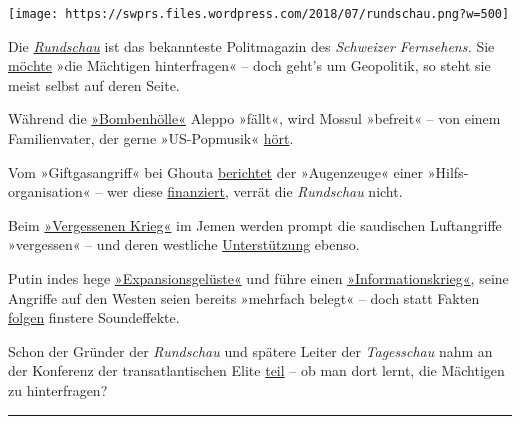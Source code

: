 \texttt{[image: https://swprs.files.wordpress.com/2018/07/rundschau.png?w=500]}

Die
\emph{\href{https://de.wikipedia.org/wiki/Rundschau_(SRF)}{Rundschau}}
ist das bekannteste Polit­ma­ga­zin des \emph{Schweizer Fernsehens.} Sie
\href{https://www.srf.ch/sendungen/rundschau/50-jahre-rundschau-die-jubilaeumssendung}{möchte}
»die Mächtigen hinterfragen« -- doch geht's um Geo­po­litik, so steht
sie meist selbst auf deren Seite.

Während die
\href{https://www.srf.ch/sendungen/rundschau/subventionierte-piloten-vaeter-am-limit-bombenhoelle-aleppo}{»Bombenhölle«}
Aleppo »fällt«, wird Mossul »befreit« -- von einem Familien­vater, der
gerne »US-Popmusik«
\href{https://www.srf.ch/sendungen/rundschau/buben-beschneidung-michel-bollag-pkb-west-mossul}{hört}.

Vom »Giftgasangriff« bei Ghouta
\href{https://www.srf.ch/sendungen/rundschau/kriminaltouristen-verhuetungsmittel-j-bitzer-giftgaseinsatz}{berichtet}
der »Augen­zeuge« einer »Hilfs­organisation« -- wer diese
\href{http://www.uossm.org/who_we_are}{finanziert}, verrät die
\emph{Rundschau} nicht.

Beim
\href{https://www.srf.ch/sendungen/rundschau/gehorsam-und-ehelos-klamauk-statt-kompromiss-vergessener-krieg}{»Vergessenen
Krieg«} im Jemen werden prompt die saudischen Luftangriffe »vergessen«
-- und deren westliche
\href{https://www.strategic-culture.org/news/2018/06/18/western-media-whitewash-yemen-genocide.html}{Unterstützung}
ebenso.

Putin indes hege
\href{https://www.srf.ch/sendungen/rundschau/gianni-infantino-fatma-samoura-iv-kosovaren-zittern-vor-russen}{»Expansionsgelüste«}
und füh­re einen
\href{https://www.srf.ch/sendungen/rundschau/putins-informationskrieg-milliarden-jongleur-bastos-camorra}{»Informationskrieg«},
seine Angriffe auf den Westen seien bereits »mehrfach be­legt« -- doch
statt Fakten
\href{https://www.srf.ch/sendungen/rundschau/putins-informationskrieg-milliarden-jongleur-bastos-camorra}{folgen}
finstere Sound­effekte.

Schon der Gründer der \emph{Rundschau} und spätere Leiter der
\emph{Tagesschau} nahm an der Konferenz der trans­atlantischen Elite
\href{https://wikileaks.org/plusd/cables/1978ZURICH00660_d.html}{teil}
-- ob man dort lernt, die Mächtigen zu hinterfragen?

\begin{center}\rule{0.5\linewidth}{\linethickness}\end{center}


